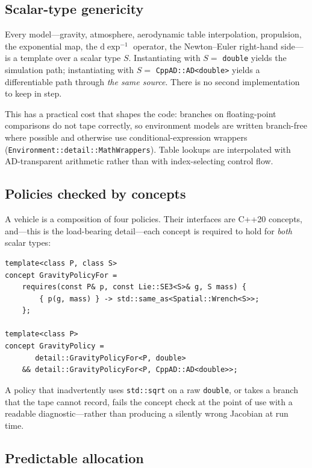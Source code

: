 \documentclass[a4paper,10pt]{article}
\newcommand{\dexp}{\mathrm{d}\exp}
\newcommand{\code}[1]{\texttt{\small #1}}
\theoremstyle{definition}
\begin{document}
\subsection{Scalar-type genericity}

Every model---gravity, atmosphere, aerodynamic table interpolation,
propulsion, the exponential map, the $\dexp^{-1}$ operator, the Newton--Euler
right-hand side---is a template over a scalar type $S$.  Instantiating with
$S = $ \code{double} yields the simulation path; instantiating with
$S = $ \code{CppAD::AD<double>} \citep{cppad} yields a differentiable path
through \emph{the same source}.  There is no second implementation to keep in
step.

This has a practical cost that shapes the code: branches on floating-point
comparisons do not tape correctly, so environment models are written
branch-free where possible and otherwise use conditional-expression wrappers
(\code{Environment::detail::MathWrappers}).  Table lookups are interpolated
with AD-transparent arithmetic rather than with index-selecting control flow.

\subsection{Policies checked by concepts}

A vehicle is a composition of four policies.  Their interfaces are C++20
concepts, and---this is the load-bearing detail---each concept is required to
hold for \emph{both} scalar types:

\begin{lstlisting}[caption={Policy concepts are instantiated for \code{double} and for the AD type, so a model that is not differentiable is a compile error.}, label={lst:concepts}]
template<class P, class S>
concept GravityPolicyFor =
    requires(const P& p, const Lie::SE3<S>& g, S mass) {
        { p(g, mass) } -> std::same_as<Spatial::Wrench<S>>;
    };

template<class P>
concept GravityPolicy =
       detail::GravityPolicyFor<P, double>
    && detail::GravityPolicyFor<P, CppAD::AD<double>>;
\end{lstlisting}

A policy that inadvertently uses \code{std::sqrt} on a raw \code{double}, or
takes a branch that the tape cannot record, fails the concept check at the
point of use with a readable diagnostic---rather than producing a silently
wrong Jacobian at run time.

\subsection{Predictable allocation}
\end{document}
